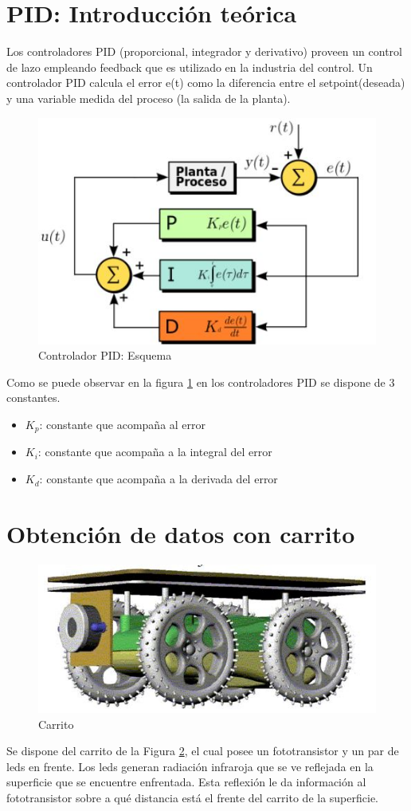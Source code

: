 \documentclass{article}
\begin{document}



\tableofcontents
\newpage

\section{PID: Introducción teórica}
Los controladores PID (proporcional, integrador y derivativo) proveen un control de lazo empleando feedback que es utilizado en la industria del control.
Un controlador PID calcula el error e(t) como la diferencia entre el setpoint(deseada) y una variable medida del proceso (la salida de la planta).


\begin{figure}[H]
\centering
\includegraphics[width=0.5\linewidth]{images/PID.jpg}
\caption{Controlador PID: Esquema}
\label{fig:PID}
\end{figure}

Como se puede observar en la figura \ref{fig:PID} en los controladores PID se dispone de 3 constantes.
\begin{itemize}
  \item $K_p$: constante que acompaña al error 
  \item $K_i$: constante que acompaña a la integral del error 
  \item $K_d$: constante que acompaña a la derivada del error
  
\end{itemize}


\newpage
\section{Obtención de datos con carrito}
\begin{figure}[H]
\centering
\includegraphics[width=0.5\linewidth]{images/carrito.JPG}
\caption{Carrito}
\label{fig:carrito}
\end{figure}
Se dispone del carrito de la Figura \ref{fig:carrito}, el cual posee un fototransistor y un par de leds en frente. Los leds generan radiación infraroja que se ve reflejada en la superficie que se encuentre enfrentada. Esta reflexión le da información al fototransistor sobre a qué distancia está el frente del carrito de la superficie. 
\end{document}
